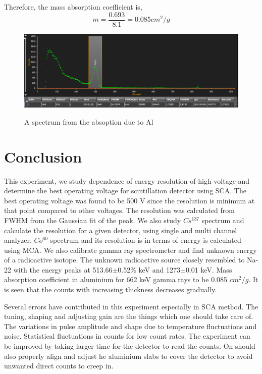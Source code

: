\documentclass[a4paper, amsfonts, amssymb, amsmath, reprint, showkeys, nofootinbib, twoside]{revtex4-1}
\begin{document}
Therefore, the mass absorption coefficient is, 
\begin{equation}
	m=\frac{0.693}{8.1}=0.085 cm^2/g
\end{equation}

\begin{widetext}
	\begin{minipage}{\linewidth}
		\begin{figure}[H]
			\centering
			\includegraphics[width=\linewidth]{ma}
			\label{fig:sample}
			\caption{A spectrum from the absoption due to Al}
		\end{figure}    
	\end{minipage}
\end{widetext}

\section{Conclusion}
This experiment, we study dependence of energy resolution of high voltage and determine the best operating voltage for scintillation detector using SCA. The best operating voltage was found to be 500 V since the resolution is minimum at that point compared to other voltages. The resolution was calculated from FWHM from the Gaussian fit of the peak. We also study $Cs^{137}$ spectrum and calculate the resolution for a given detector, using single and multi channel analyzer. $Co^{60}$ spectrum and its resolution is in terms of energy is calculated using MCA. We also calibrate gamma ray spectrometer and find unknown energy of a radioactive isotope. The unknown radioactive source closely resembled to Na-22 with the energy peaks at 513.66$\pm$0.52\% keV and 1273$\pm$0.01 keV. Mass absorption coefficient in aluminium for 662 keV gamma rays to be 0.085 $cm^2/g$. It is seen that the counts with increasing thickness decreases gradually.

Several errors have contributed in this experiment especially in SCA method. The tuning, shaping and adjusting gain are the things which one should take care of. The variations in pulse amplitude and shape due to temperature fluctuations and noise. Statistical fluctuations in counts for low count rates. The experiment can be improved by taking larger time for the detector to read the counts. On should also properly align and adjust he aluminium slabs to cover the detector to avoid unwanted direct counts to creep in.
\end{document}
